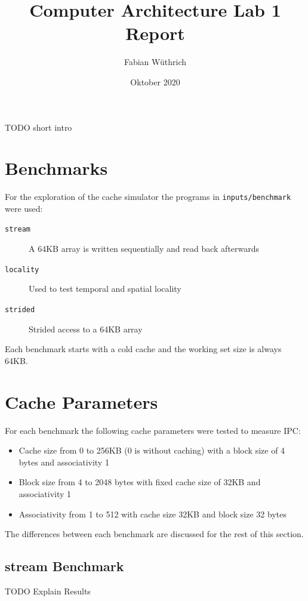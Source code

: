 \documentclass[a4paper]{article}
\begin{document}
\title{Computer Architecture Lab 1 Report}
\author{Fabian Wüthrich}
\date{Oktober 2020}
\maketitle

\noindent
TODO short intro

\section*{Benchmarks}

For the exploration of the cache simulator the programs in
\verb|inputs/benchmark| were used:
\begin{description}
    \item[\texttt{stream}] A 64KB array is written sequentially and read back afterwards
    \item[\texttt{locality}] Used to test temporal and spatial locality
    \item[\texttt{strided}] Strided access to a 64KB array
\end{description}
Each benchmark starts with a cold cache and the working set size is always 64KB.

\section*{Cache Parameters}

For each benchmark the following cache parameters were tested to measure IPC:
\begin{itemize}
    \item Cache size from 0 to 256KB (0 is without caching) with a block size of
        4 bytes and associativity 1
    \item Block size from 4 to 2048 bytes with fixed cache size of 32KB and associativity 1
    \item Associativity from 1 to 512 with cache size 32KB and block size 32 bytes
\end{itemize}
The differences between each benchmark are discussed for the rest of this section.

\subsection*{stream Benchmark}

TODO Explain Results
\end{document}
